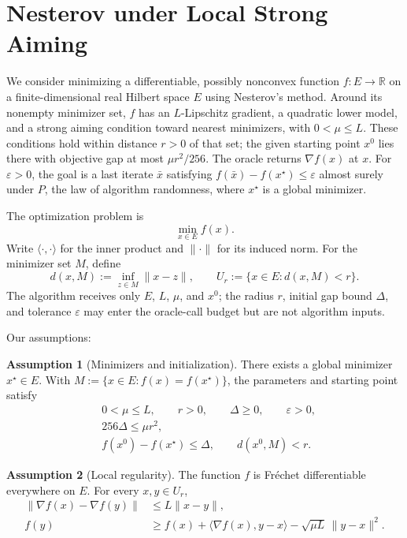 \documentclass[10pt]{article}
\theoremstyle{definition}
\newtheorem{assumption}{Assumption}
\begin{document}
\section*{Nesterov under Local Strong Aiming}
We consider minimizing a differentiable, possibly nonconvex function $f:E\to\mathbb{R}$ on a finite-dimensional real Hilbert space $E$ using Nesterov's method. Around its nonempty minimizer set, $f$ has an $L$-Lipschitz gradient, a quadratic lower model, and a strong aiming condition toward nearest minimizers, with $0<\mu\leq L$. These conditions hold within distance $r>0$ of that set; the given starting point $x^0$ lies there with objective gap at most $\mu r^2/256$. The oracle returns $\nabla f(x)$ at $x$. For $\varepsilon>0$, the goal is a last iterate $\bar{x}$ satisfying $f(\bar{x})-f(x^\star)\leq\varepsilon$ almost surely under $P$, the law of algorithm randomness, where $x^\star$ is a global minimizer.

The optimization problem is
\[
\min_{x\in E} f(x).
\]
Write $\langle\cdot,\cdot\rangle$ for the inner product and $\|\cdot\|$ for its induced norm. For the minimizer set $M$, define
\[
d(x,M):=\inf_{z\in M}\|x-z\|,
\qquad U_r:=\{x\in E:d(x,M)<r\}.
\]
The algorithm receives only $E$, $L$, $\mu$, and $x^0$; the radius $r$, initial gap bound $\Delta$, and tolerance $\varepsilon$ may enter the oracle-call budget but are not algorithm inputs.

Our assumptions:
\begin{assumption}[Minimizers and initialization]
There exists a global minimizer $x^\star\in E$. With $M:=\{x\in E:f(x)=f(x^\star)\}$, the parameters and starting point satisfy
\[
\begin{aligned}
&0<\mu\leq L,\qquad r>0,\qquad \Delta\geq0,\qquad \varepsilon>0,\\
&256\Delta\leq\mu r^2,\\
&f(x^0)-f(x^\star)\leq\Delta,\qquad d(x^0,M)<r.
\end{aligned}
\]
\end{assumption}

\begin{assumption}[Local regularity]
The function $f$ is Fr\'echet differentiable everywhere on $E$. For every $x,y\in U_r$,
\[
\begin{aligned}
\|\nabla f(x)-\nabla f(y)\|&\leq L\|x-y\|,\\
f(y)&\geq f(x)+\langle\nabla f(x),y-x\rangle
-\sqrt{\mu L}\,\|y-x\|^2.
\end{aligned}
\]
\end{assumption}
\end{document}
